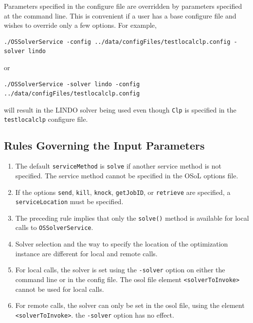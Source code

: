 \documentclass[11pt]{article}
\renewcommand{\_}{{\char"5F}}
\renewcommand{\{}{{\char"7B}}
\renewcommand{\}}{{\char"7D}}
\renewcommand{\^}{{\char"0D}}
\renewcommand{\'}{{\char"0D}}
\begin{document}
\begin{enumerate}[Step 1:]
Parameters specified in the configure file are overridden by parameters specified at the command line.
This is convenient if a user has a base configure file and wishes to override only a few options. For example,
\begin{verbatim}
./OSSolverService -config ../data/configFiles/testlocalclp.config -solver lindo
\end{verbatim}
or
\begin{verbatim}
./OSSolverService -solver lindo -config ../data/configFiles/testlocalclp.config
\end{verbatim}
will result in the LINDO solver being used even though {\tt Clp} is specified in the
{\tt testlocalclp} configure file.



\subsection{Rules Governing the Input Parameters}\label{section:ossolverservicerules}

\begin{enumerate}
\item{}  The default {\tt serviceMethod} is {\tt solve} if another service method is not specified.
The service method cannot be specified in the OSoL options file.

\item{}  If the options {\tt send}, {\tt kill},
{\tt knock},  {\tt getJobID},
or {\tt retrieve} are specified,
a  {\tt serviceLocation} must be specified.

\item{}  The preceding rule implies that only the {\tt solve()} method is available for local calls
to {\tt OSSolverService}.

\item{} Solver selection and the way to specify the location of the optimization instance are different 
for local and remote calls.

\item{} For local calls, the solver is set using the {\tt -solver} option on either the command line or in the
config file. The osol file element {\tt <solverToInvoke>} cannot be used for local calls.

\item{} For remote calls, the solver can only be set in the osol file, using the element {\tt <solverToInvoke>}.
the {\tt -solver} option has no effect.


\end{enumerate}
\end{enumerate}
\end{document}
